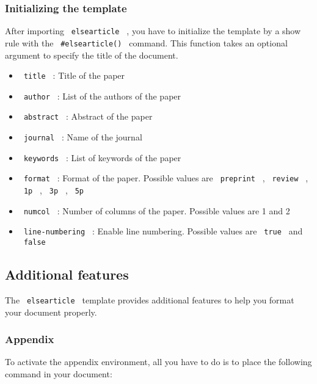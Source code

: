 \subsubsection{Initializing the
template}\label{initializing-the-template}

After importing \texttt{\ elsearticle\ } , you have to initialize the
template by a show rule with the \texttt{\ \#elsearticle()\ } command.
This function takes an optional argument to specify the title of the
document.

\begin{itemize}
\tightlist
\item
  \texttt{\ title\ } : Title of the paper
\item
  \texttt{\ author\ } : List of the authors of the paper
\item
  \texttt{\ abstract\ } : Abstract of the paper
\item
  \texttt{\ journal\ } : Name of the journal
\item
  \texttt{\ keywords\ } : List of keywords of the paper
\item
  \texttt{\ format\ } : Format of the paper. Possible values are
  \texttt{\ preprint\ } , \texttt{\ review\ } , \texttt{\ 1p\ } ,
  \texttt{\ 3p\ } , \texttt{\ 5p\ }
\item
  \texttt{\ numcol\ } : Number of columns of the paper. Possible values
  are 1 and 2
\item
  \texttt{\ line-numbering\ } : Enable line numbering. Possible values
  are \texttt{\ true\ } and \texttt{\ false\ }
\end{itemize}

\subsection{Additional features}\label{additional-features}

The \texttt{\ elsearticle\ } template provides additional features to
help you format your document properly.

\subsubsection{Appendix}\label{appendix}

To activate the appendix environment, all you have to do is to place the
following command in your document:

\begin{Shaded}
\begin{Highlighting}[]

\end{Highlighting}
\end{Shaded}

